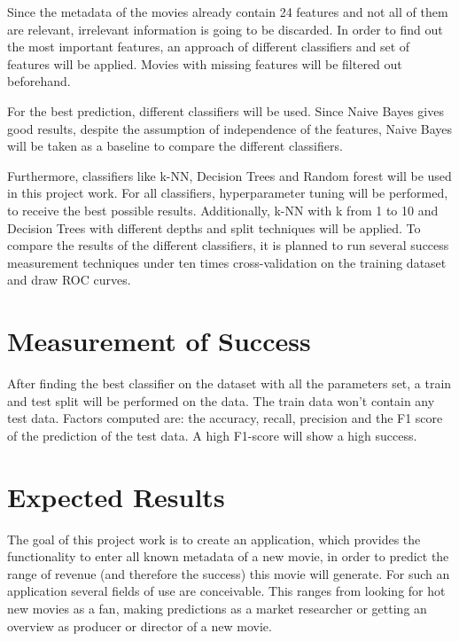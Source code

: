 Since the metadata of the movies already contain 24 features and not all of them are relevant, irrelevant information is going to be discarded. In order to find out the most important features, an approach of different classifiers and set of features will be applied. Movies with missing features will be filtered out beforehand. 

For the best prediction, different classifiers will be used. Since Naive Bayes gives good results, despite the assumption of independence of the features, Naive Bayes will be taken as a baseline to compare the different classifiers.

Furthermore, classifiers like k-NN, Decision Trees and Random forest will be used in this project work. For all classifiers, hyperparameter tuning will be performed, to receive the best possible results. Additionally, k-NN with k from 1 to 10 and Decision Trees with different depths and split techniques will be applied.
To compare the results of the different classifiers, it is planned to run several success measurement techniques under ten times cross-validation on the training dataset and draw ROC curves.


\section{Measurement of Success}
After finding the best classifier on the dataset with all the parameters set, a train and test split will be performed on the data. The train data won't contain any test data. Factors computed are: the accuracy, recall, precision and the F1 score of the prediction of the test data. A high F1-score will show a high success.

\section{Expected Results}
The goal of this project work is to create an application, which provides the functionality to enter all known metadata of a new movie, in order to predict the range of revenue (and therefore the success) this movie will generate. For such an application several fields of use are conceivable. This ranges from looking for hot new movies as a fan, making predictions as a market researcher or getting an overview as producer or director of a new movie.





